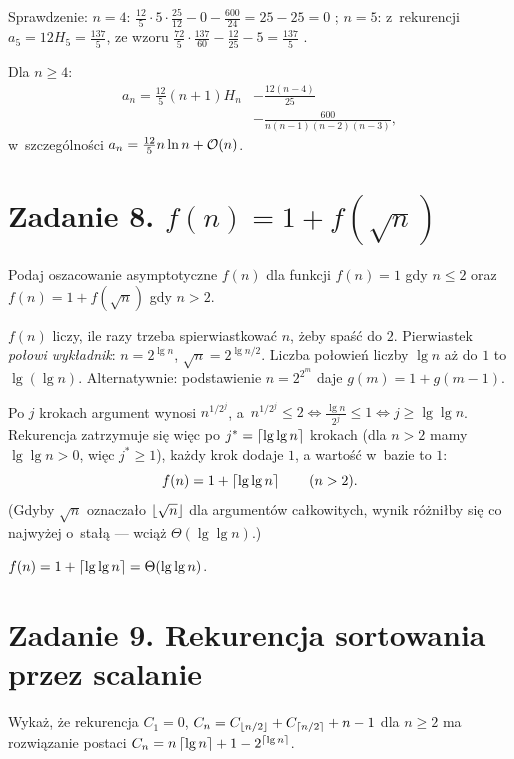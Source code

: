 \documentclass[11pt]{article}
\begin{document}
Sprawdzenie: $n=4$: $\frac{12}{5}\cdot5\cdot\frac{25}{12}-0-\frac{600}{24}=25-25=0$ \checkmark;
$n=5$: z~rekurencji $a_5=12H_5=\frac{137}{5}$, ze wzoru $\frac{72}{5}\cdot\frac{137}{60}-\frac{12}{25}-5=\frac{137}{5}$ \checkmark.
\begin{odpowiedz}
Dla $n\ge4$:
\begin{align*}
a_n = \frac{12}{5}(n+1)H_n &- \frac{12(n-4)}{25}\\ &- \frac{600}{n(n-1)(n-2)(n-3)},
\end{align*}
w~szczególności $a_n = \frac{12}{5}n\ln n + \mathcal{O}(n)$.
\end{odpowiedz}

\section{Zadanie 8. \texorpdfstring{$f(n)=1+f(\sqrt n)$}{f(n) = 1 + f(sqrt n)}}
\begin{tresc}
Podaj oszacowanie asymptotyczne $f(n)$ dla funkcji $f(n)=1$ gdy $n\le2$ oraz
$f(n)=1+f(\sqrt n)$ gdy $n>2$.
\end{tresc}

\begin{intuicja}
$f(n)$ liczy, ile razy trzeba spierwiastkować $n$, żeby spaść do $2$.
Pierwiastek \emph{połowi wykładnik}: $n=2^{\lg n}$, $\sqrt n=2^{\lg n/2}$.
Liczba połowień liczby $\lg n$ aż do $1$ to $\lg(\lg n)$.
Alternatywnie: podstawienie $n=2^{2^m}$ daje $g(m)=1+g(m-1)$.
\end{intuicja}
\formalnie
Po $j$ krokach argument wynosi $n^{1/2^j}$, a~$n^{1/2^j}\le2 \iff \frac{\lg n}{2^j}\le1\iff j\ge\lg\lg n$.
Rekurencja zatrzymuje się więc po $j^*=\left\lceil \operatorname{lg}\operatorname{lg} n \right\rceil$ krokach (dla $n>2$ mamy
$\lg\lg n>0$, więc $j^*\ge1$), każdy krok dodaje $1$, a wartość w~bazie to $1$:
\[
f(n) = 1+\left\lceil \operatorname{lg}\operatorname{lg} n \right\rceil\qquad(n>2).
\]
(Gdyby $\sqrt n$ oznaczało $\left\lfloor \sqrt n \right\rfloor$ dla argumentów całkowitych, wynik
różniłby się co najwyżej o~stałą --- wciąż $\Theta(\lg\lg n)$.)
\begin{odpowiedz}$f(n)=1+\left\lceil \operatorname{lg}\operatorname{lg} n \right\rceil=\Theta(\operatorname{lg}\operatorname{lg} n)$.\end{odpowiedz}

\section{Zadanie 9. Rekurencja sortowania przez scalanie}
\begin{tresc}
Wykaż, że rekurencja $C_1=0$, $C_n=C_{\left\lfloor n/2 \right\rfloor}+C_{\left\lceil n/2 \right\rceil}+n-1$ dla
$n\ge2$ ma rozwiązanie postaci $C_n=n\left\lceil \operatorname{lg} n \right\rceil+1-2^{\left\lceil \operatorname{lg} n \right\rceil}$.
\end{tresc}
\end{document}
